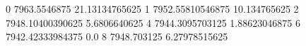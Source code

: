 0 7963.5546875 21.13134765625
1 7952.55810546875 10.134765625
2 7948.10400390625 5.6806640625
4 7944.3095703125 1.88623046875
6 7942.42333984375 0.0
8 7948.703125 6.27978515625
